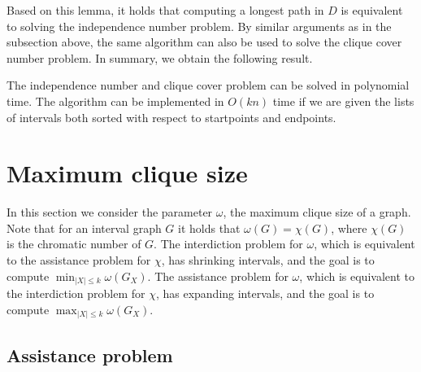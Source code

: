 Based on this lemma, it holds that computing a longest path in $D$ is 
equivalent to solving the independence number  problem. By similar 
arguments as in the subsection above, the same algorithm can also be used to 
solve the clique cover number  problem.
In summary, we obtain the following result.

\begin{theorem}
    The independence number  and clique cover  problem  can 
    be solved in polynomial time.
    The algorithm can be implemented in $O(kn)$ time if we are given the lists of 
    intervals both sorted with respect to startpoints and endpoints.
\end{theorem}

\section{Maximum clique size}
In this section we consider the parameter $\omega$,
the maximum clique size of a graph. Note that for an interval graph $G$ it holds
that $\omega(G) = \chi(G)$, where $\chi(G)$ is the chromatic number of $G$.
The interdiction problem for $\omega$, which is equivalent to the assistance problem 
for $\chi$, has shrinking intervals, 
and the goal is to compute $\min_{|X| \leq k} \omega(G_X)$. 
The assistance problem for $\omega$, which is equivalent to the interdiction problem for $\chi$,
has expanding intervals, and the goal is to compute $\max_{|X| \leq k} \omega(G_X)$.

\subsection{Assistance problem}

